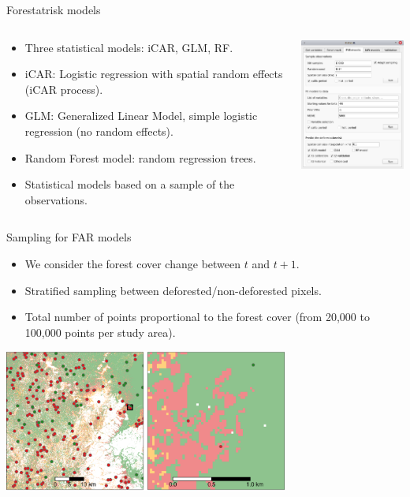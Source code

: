 \documentclass[10pt,table,dvipsnames,compress]{beamer}
\begin{document}
\begin{frame}[label={sec:org989b75f}]{Forestatrisk models}
\begin{columns}
\begin{column}{0.5\columnwidth}
\begin{itemize}
\item Three statistical models: iCAR, GLM, RF.
\item iCAR: Logistic regression with spatial random effects (iCAR process).
\item GLM: Generalized Linear Model, simple logistic regression (no random effects).
\item Random Forest model: random regression trees.
\item Statistical models based on a sample of the observations.
\end{itemize}
\end{column}

\begin{column}{0.5\columnwidth}
\begin{center}
\includegraphics[width=5cm]{figs/plugin_api/interface_far_models.png}
\end{center}  
\end{column}
\end{columns}
\end{frame}

\begin{frame}[label={sec:org0bbacb1}]{Sampling for FAR models}
\begin{itemize}
\item We consider the forest cover change between \(t\) and \(t+1\).
\item Stratified sampling between deforested/non-deforested pixels.
\item Total number of points proportional to the forest cover (from
20,000 to 100,000 points per study area).
\end{itemize}

\begin{center}
\includegraphics[width=0.7\textwidth]{figs/sm/sample.png}
\end{center}
\end{frame}
\end{document}
